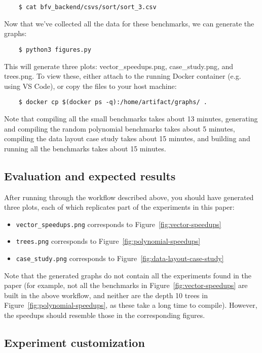 \begin{verbatim}
    $ cat bfv_backend/csvs/sort/sort_3.csv    
\end{verbatim}
Now that we've collected all the data for these benchmarks, we can generate the graphs:
\begin{verbatim}
    $ python3 figures.py
\end{verbatim}
This will generate three plots: vector\_speedups.png, case\_study.png, and trees.png. To view these, either attach to the running Docker container (e.g. using VS Code), or copy the files to your host machine:
\begin{verbatim}
    $ docker cp $(docker ps -q):/home/artifact/graphs/ .    
\end{verbatim}

Note that compiling all the small benchmarks takes about 13 minutes, generating and compiling the random polynomial benchmarks takes about 5 minutes, compiling the data layout case study takes about 15 minutes, and building and running all the benchmarks takes about 15 minutes.

\subsection{Evaluation and expected results}

After running through the workflow described above, you should have generated three plots, each of which replicates part of the experiments in this paper:
\begin{itemize}
    \item {\tt vector\_speedups.png} corresponds to Figure~\ref{fig:vector-speedups}
    \item {\tt trees.png} corresponds to Figure~\ref{fig:polynomial-speedups}
    \item {\tt case\_study.png} corresponds to Figure~\ref{fig:data-layout-case-study}
\end{itemize}
Note that the generated graphs do not contain all the experiments found in the paper (for example, not all the benchmarks in Figure~\ref{fig:vector-speedups} are built in the above workflow, and neither are the depth 10 trees in Figure~\ref{fig:polynomial-speedups}, as these take a long time to compile).
However, the speedups should resemble those in the corresponding figures.

\subsection{Experiment customization}
